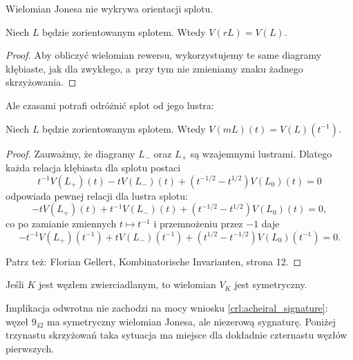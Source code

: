 Wielomian Jonesa nie wykrywa orientacji splotu.

\begin{proposition}
    Niech $L$ będzie zorientowanym splotem.
    Wtedy $V(rL)=V(L)$.
\end{proposition}

\begin{proof}
    Aby obliczyć wielomian rewersu, wykorzystujemy te same diagramy kłębiaste,
    jak dla zwykłego, a~przy tym nie zmieniamy znaku żadnego skrzyżowania.
\end{proof}

Ale czasami potrafi odróżnić splot od jego lustra:

\begin{proposition}
    Niech $L$ będzie zorientowanym splotem.
    Wtedy $V(mL)(t)=V(L)(t^{-1})$.
\end{proposition}

\begin{proof}
    Zauważmy, że diagramy $L_-$ oraz $L_+$ są wzajemnymi lustrami.
    Dlatego każda relacja kłębiasta dla splotu postaci
    \begin{equation}
        t^{-1} V(L_+)(t) - tV(L_-)(t) + (t^{-1/2} - t^{1/2}) V(L_0)(t) = 0
    \end{equation}
    odpowiada pewnej relacji dla lustra splotu:
    \begin{equation}
        -tV(L_+)(t) + t^{-1} V(L_-)(t) + (t^{-1/2} - t^{1/2}) V(L_0)(t) = 0,
    \end{equation}
    co po zamianie zmiennych $t \mapsto t^{-1}$ i przemnożeniu przez $-1$ daje
    \begin{equation}
        -t^{-1} V(L_+)(t^{-1}) + t V(L_-)(t^{-1}) + (t^{1/2} - t^{-1/2}) V(L_0)(t^{-1}) = 0.
    \end{equation}

    Patrz też: Florian Gellert, Kombinatorische Invarianten, strona 12.
\end{proof}

\begin{corollary}
    Jeśli $K$ jest węzłem zwierciadlanym, to wielomian $V_K$ jest symetryczny.
\end{corollary}

Implikacja odwrotna nie zachodzi na mocy wniosku \ref{crl:acheiral_signature}: węzeł $9_{42}$ ma symetryczny wielomian Jonesa, ale niezerową sygnaturę.
Poniżej trzynastu skrzyżowań taka sytuacja ma miejsce dla dokładnie czternastu węzłów pierwszych.


